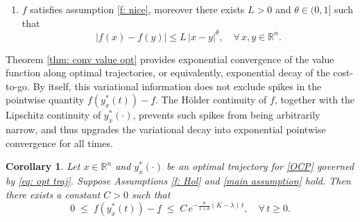 \documentclass[12pt]{amsart}
\numberwithin{equation}{section}
\theoremstyle{plain}
\newtheorem{corollary}[theorem]{Corollary}
\begin{document}
\begin{enumerate}[label=\textbf{(A\arabic*')}]
\item\label{f: Hol} $f$ satisfies assumption \ref{f: nice}, moreover there exists $L>0$ and $\theta\in (0,1]$ such that
\begin{equation*}
    |f(x) - f(y)| \leq L\,|x-y|^{\theta}, \quad \forall\,x,y\in \mathbb{R}^{n}.
\end{equation*}
\end{enumerate}

Theorem \ref{thm: conv value opt} provides exponential convergence of the value function along optimal trajectories, or equivalently, exponential decay of the cost-to-go. By itself, this variational information does not exclude spikes in the pointwise quantity $f\left(y_x^*(t)\right)-\underline{f}$. The H\"older continuity of  $f$, together with the Lipschitz continuity of $y_x^*(\cdot)$, prevents such spikes from being arbitrarily narrow, and thus upgrades the variational decay into exponential pointwise convergence for all times.

\begin{corollary}
Let $x\in \mathbb{R}^{n}$ and  $y_{x}^{*}(\cdot)$ be an optimal trajectory for \eqref{OCP} governed by \eqref{eq: opt traj}. 
Suppose Assumptions \ref{f: Hol} and \ref{main assumption} hold. Then there exists a constant $C>0$ such that
\begin{equation*}
    0 \; \leq \; f(y_{x}^{*}(t)) - \underline{f} \; \leq \; C\,e^{-\frac{\theta}{1+\theta}(K-\lambda)\,t}, \quad \forall\,t\geq0.
\end{equation*}
\end{corollary}
\end{document}
